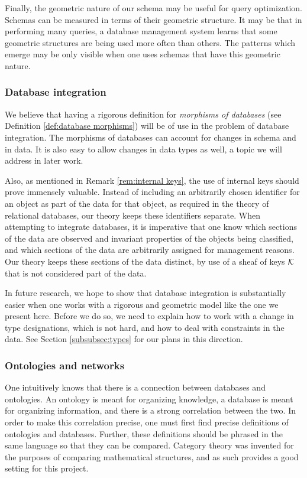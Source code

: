 \documentclass{amsart}
\begin{document}
Finally, the geometric nature of our schema may be useful for query optimization.  Schemas can be measured in terms of their geometric structure.  It may be that in performing many queries, a database management system learns that some geometric structures are being used more often than others.  The patterns which emerge may be only visible when one uses schemas that have this geometric nature.

\subsubsection{Database integration}

We believe that having a rigorous definition for {\em morphisms of databases} (see Definition \ref{def:database morphisms}) will be of use in the problem of database integration.  The morphisms of databases can account for changes in schema and in data.  It is also easy to allow changes in data types as well, a topic we will address in later work.

Also, as mentioned in Remark \ref{rem:internal keys}, the use of internal keys should prove immensely valuable.  Instead of including an arbitrarily chosen identifier for an object as part of the data for that object, as required in the theory of relational databases, our theory keeps these identifiers separate.  When attempting to integrate databases, it is imperative that one know which sections of the data are observed and invariant properties of the objects being classified, and which sections of the data are arbitrarily assigned for management reasons.  Our theory keeps these sections of the data distinct, by use of a sheaf of keys $\mathcal{K}$ that is not considered part of the data.

In future research, we hope to show that database integration is substantially easier when one works with a rigorous and geometric model like the one we present here.  Before we do so, we need to explain how to work with a change in type designations, which is not hard, and how to deal with constraints in the data.  See Section \ref{subsubsec:types} for our plans in this direction.

\subsubsection{Ontologies and networks}

One intuitively knows that there is a connection between databases and ontologies.  An ontology is meant for organizing knowledge, a database is meant for organizing information, and there is a strong correlation between the two.  In order to make this correlation precise, one must first find precise definitions of ontologies and databases.  Further, these definitions should be phrased in the same language so that they can be compared.  Category theory was invented for the purposes of comparing mathematical structures, and as such provides a good setting for this project.
\end{document}
